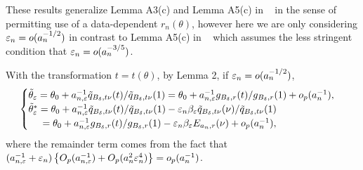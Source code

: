\documentclass[9pt]{article}
\theoremstyle{remark}
\begin{document}
	These results generalize Lemma A3(c) and Lemma A5(c) in ~\cite{Li2017} in the sense of permitting use of a data-dependent $r_n(\theta)$, however here we are only considering $\varepsilon_n = o(a_n^{-1/2})$ in contrast to Lemma A5(c) in ~\cite{Li2017} which assumes the less stringent condition that $\varepsilon_n = o(a_n^{-3/5})$.
	
	With the transformation $t=t(\theta)$, by Lemma 2, if $\varepsilon_{n}=o(a_{n}^{-1/2})$,
	\begin{eqnarray}
	\begin{cases}
	\tilde{\theta}_{\varepsilon}=\theta_{0}+a_{n,\varepsilon}^{-1}\tilde{q}_{B_{\delta},t\nu}(t)/\tilde{q}_{B_{\delta},t\nu}(1)=\theta_{0}+a_{n,\varepsilon}^{-1}g_{B_{\delta},r}(t)/g_{B_{\delta},r}(1)+o_{p}(a_{n}^{-1}),\\
	\tilde{\theta}_{\varepsilon}^{*}=\theta_{0}+a_{n,\varepsilon}^{-1}\tilde{q}_{B_{\delta},t\nu}(t)/\tilde{q}_{B_{\delta},t\nu}(1)-\varepsilon_{n}\beta_{\varepsilon}\tilde{q}_{B_{\delta},t\nu}(\nu)/\tilde{q}_{B_{\delta},t\nu}(1)\\
	\hspace{5mm} =\theta_{0}+a_{n,\varepsilon}^{-1}g_{B_{\delta},r}(t)/g_{B_{\delta},r}(1)-\varepsilon_{n}\beta_{\varepsilon}E_{a_{n},r}(\nu)+o_{p}(a_{n}^{-1}),
	\end{cases}\label{eq4}
	\end{eqnarray}
	where the remainder term comes from the fact that $(a_{n,\varepsilon}^{-1}+\varepsilon_{n})\left\{ O_{p}(a_{n,\varepsilon}^{-1})+O_{p}(a_{n}^{2}\varepsilon_{n}^{4})\right\} =o_{p}(a_{n}^{-1})$.
	
\end{document}
